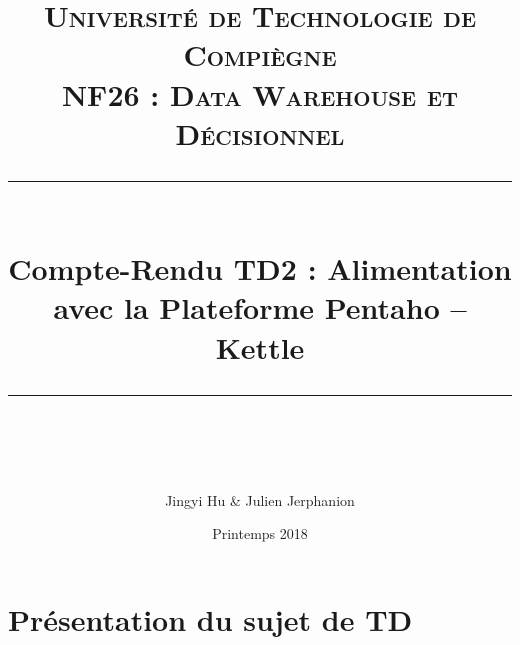 
\title{
\normalfont \normalsize
\textsc{Université de Technologie de Compiègne\\
NF26 : Data Warehouse et Décisionnel} \\
[10pt]
\rule{\linewidth}{0.5pt} \\[6pt]
\huge Compte-Rendu TD2 : Alimentation avec la Plateforme Pentaho -- Kettle \\
\rule{\linewidth}{0.5pt}  \\[10pt]
}
\author{Jingyi Hu \& Julien Jerphanion}
\date{\normalsize Printemps 2018}



\maketitle
\noindent



\section{Présentation du sujet de TD}

